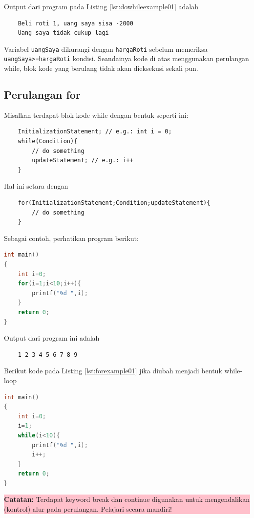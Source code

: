Output dari program pada Listing \ref{lst:dowhileexample01} adalah
\begin{verbatim}
    Beli roti 1, uang saya sisa -2000
    Uang saya tidak cukup lagi
\end{verbatim}
Variabel \verb|uangSaya| dikurangi dengan \verb|hargaRoti| sebelum memeriksa \verb|uangSaya>=hargaRoti| kondisi.
Seandainya kode di atas menggunakan perulangan while, blok kode yang berulang tidak akan dieksekusi sekali pun.
\subsection{Perulangan for}
Misalkan terdapat blok kode while dengan bentuk seperti ini:
\begin{verbatim}
    InitializationStatement; // e.g.: int i = 0;
    while(Condition){
        // do something
        updateStatement; // e.g.: i++ 
    }
\end{verbatim}
Hal ini setara dengan
\begin{verbatim}
    for(InitializationStatement;Condition;updateStatement){
        // do something
    }
\end{verbatim}

Sebagai contoh, perhatikan program berikut:
\begin{lstlisting}[language=c,caption = Contoh Penggunaan for,label=lst:forexample01]
int main()
{
    int i=0;
    for(i=1;i<10;i++){
        printf("%d ",i);
    }
	return 0;
}
\end{lstlisting}
Output dari program ini adalah
\begin{verbatim}
    1 2 3 4 5 6 7 8 9 
\end{verbatim}
Berikut kode pada Listing \ref{lst:forexample01} jika diubah menjadi bentuk while-loop
\begin{lstlisting}[language=c,caption = For dalam bentuk while,label=lst:forwhileform01]
int main()
{
    int i=0;
    i=1;
    while(i<10){
        printf("%d ",i);
        i++;
    }
	return 0;
}
\end{lstlisting}
\begin{center}
	\colorbox{pink}{\parbox{0.8\linewidth}{\textbf{Catatan:} Terdapat keyword break dan continue digunakan untuk mengendalikan (kontrol) alur pada perulangan. Pelajari secara mandiri!}}
\end{center}

